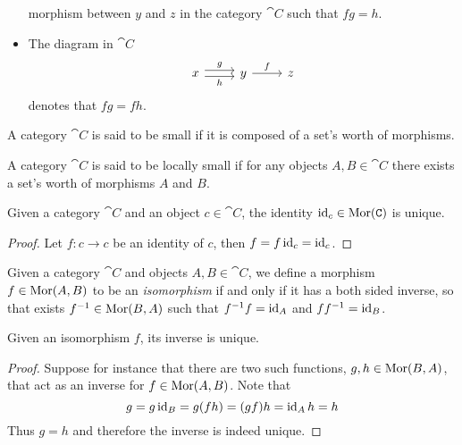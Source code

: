 \begin{notation}
\begin{itemize}
              morphism between \(y\) and \(z\) in the category \(\cat C\) such that \(fg =
              h\).
        \item The diagram in \(\cat C\)
              \[
                  \begin{tikzcd}
                      x \ar[r, shift right, swap, "h"] \ar[r, shift left, "g"]
                      &y \ar[r, "f"]
                      &z
                  \end{tikzcd}
              \]
              denotes that \(f g = f h\).
    \end{itemize}
\end{notation}

\begin{definition}[Small]\label{def: small cat}
    A category \(\cat C\) is said to be small if it is composed of a set's worth of
    morphisms.
\end{definition}

\begin{definition}
    A category \(\cat C\) is said to be locally small if for any objects \(A,B \in
    \cat C\) there exists a set's worth of morphisms \(A\) and \(B\).
\end{definition}

\begin{corollary}\label{cor: unique identity}
    Given a category \(\cat C\) and an object \(c \in \cat C\), the identity \(\operatorname{id}_c
    \in \operatorname{Mor}(\texttt C)\) is unique.
\end{corollary}

\begin{proof}
    Let \(f: c \to c\) be an identity of \(c\), then \(f = f \operatorname{id}_c = \operatorname{id}_c\).
\end{proof}

\begin{definition}[Isomorphism]\label{def:isomorphism}
    Given a category \(\cat{C}\) and objects \(A, B \in \cat{C}\), we define a
    morphism \(f \in \operatorname{Mor}(A, B)\) to be an \emph{isomorphism} if and only if it has
    a both sided inverse, so that exists \(f^{-1} \in \operatorname{Mor}(B, A)\) such that
    \(f^{-1}f = \operatorname{id}_A\) and \(ff^{-1} = \operatorname{id}_B\).
\end{definition}

\begin{proposition}\label{prop: iso unique inverse}
    Given an isomorphism \(f\), its inverse is unique.
\end{proposition}

\begin{proof}
    Suppose for instance that there are two such functions, \(g, h \in \operatorname{Mor}(B, A)\),
    that act as an inverse for \(f \in \operatorname{Mor}(A, B)\). Note that
    \[
        g = g \operatorname{id}_B = g(f h) = (g f) h = \operatorname{id}_A h = h
    \]
    Thus \(g = h\) and therefore the inverse is indeed unique.
\end{proof}

